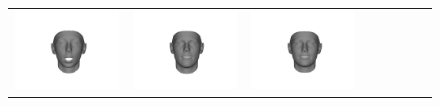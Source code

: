 \begin{figure}[t!]
\begin{center}
{\begin{tabular}{ @{}c@{}c@{}c@{}c@{}c@{}c@{}c@{}c@{}}
\includegraphics[trim=400 180 370 230,clip,width=\VaryingShapeFigWid]{img/Basis/pred_shape_6_neg.jpg} &
\includegraphics[trim=400 180 370 230,clip,width=\VaryingShapeFigWid]{img/Basis/pred_shape_31_neg.jpg} &
\includegraphics[trim=400 180 370 230,clip,width=\VaryingShapeFigWid]{img/Basis/pred_shape_135_neg.jpg} &

\end{tabular}}
\end{center}
\end{figure}
